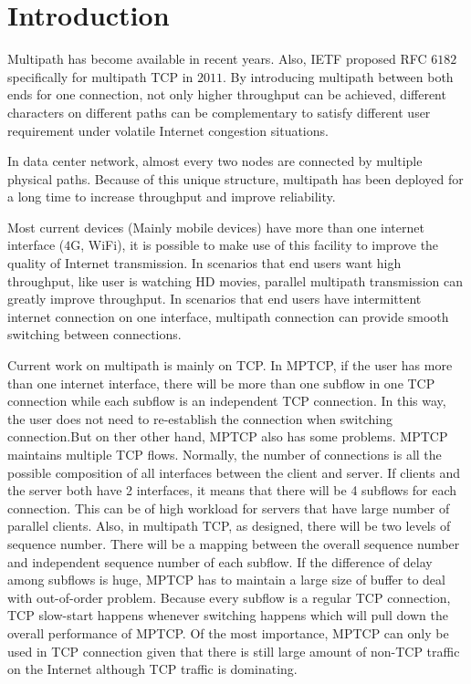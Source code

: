 \section{Introduction}
\label{sec:intro}
Multipath has become available in recent years. Also, IETF proposed RFC $6182$ specifically for multipath TCP in $2011$. By introducing multipath between both ends for one connection, not only higher throughput can be achieved, different characters on different paths can be complementary to satisfy different user requirement under volatile Internet congestion situations.

In data center network, almost every two nodes are connected by multiple physical paths. Because of this unique structure, multipath has been deployed for a long time to increase throughput and improve reliability.

Most current devices (Mainly mobile devices) have more than one internet interface ($4$G, WiFi), it is possible to make use of this facility to improve the quality of  Internet transmission. In scenarios that end users want high throughput, like user is watching HD movies, parallel multipath transmission can greatly improve throughput. In scenarios that end users have intermittent internet connection on one interface, multipath connection can provide smooth switching between connections.

Current work on multipath is mainly on TCP. In MPTCP, if the user has more than one internet interface, there will be more than one subflow in one TCP connection while each subflow is an independent TCP connection. In this way, the user does not need to re-establish the connection when switching connection.But on ther other hand, MPTCP also has some problems. MPTCP maintains multiple TCP flows. Normally, the number of connections is all the possible composition of all interfaces between the client and server. If clients and the server both have 2 interfaces, it means that there will be 4 subflows for each connection. This can be of high workload for servers that have large number of parallel clients. Also, in multipath TCP, as designed, there will be two levels of sequence number. There will be a mapping between the overall sequence number and independent sequence number of each subflow. If the difference of delay among subflows is huge, MPTCP has to maintain a large size of buffer to deal with out-of-order problem. Because every subflow is a regular TCP connection, TCP slow-start happens whenever switching happens which will pull down the overall performance of MPTCP. Of the most importance, MPTCP can only be used in TCP connection given that there is still large amount of non-TCP traffic on the Internet although TCP traffic is dominating.

